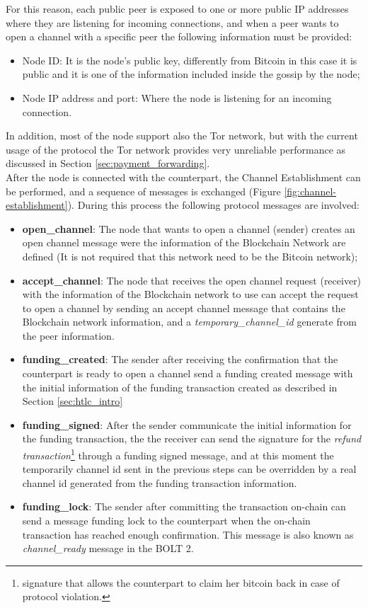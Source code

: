 For this reason, each public peer is exposed to one or more public IP addresses where
they are listening for incoming connections, and when a peer wants to open
a channel with a specific peer the following information must be provided:

\begin{itemize}
  \item Node ID: It is the node's public key, differently from Bitcoin in this case it is public and it is one of the information included inside the gossip by the node;
  \item Node IP address and port: Where the node is listening for an incoming connection.
\end{itemize}

In addition, most of the node support also the Tor network, but with the current usage of the protocol the Tor network provides very unreliable
performance as discussed in Section \ref{sec:payment_forwarding}.\\
After the node is connected with the counterpart, the Channel Establishment can be performed, and a sequence
of messages is exchanged (Figure \ref{fig:channel-establishment}). During this process
the following protocol messages are involved:

\begin{itemize}
  \item {\bf open\_channel}: The node that wants to open a channel (sender) creates an open channel message were the information of the
        Blockchain Network are defined (It is not required that this network need to be the Bitcoin network);
  \item {\bf accept\_channel}: The node that receives the open channel request (receiver) with the information of the Blockchain network to use
        can accept the request to open a channel by sending an accept channel message that contains the Blockchain network information, and
        a \emph{temporary\_channel\_id} generate from the peer information.
  \item {\bf funding\_created}: The sender after receiving the confirmation that the counterpart is ready to open a channel
        send a funding created message with the initial information of the funding transaction created as described in Section \ref{sec:htlc_intro}
  \item {\bf funding\_signed}: After the sender communicate the initial information for the funding transaction, the
        the receiver can send the signature for the \emph{refund transaction}\footnote{signature that allows the counterpart to claim her bitcoin back in case of protocol violation.} through a funding signed message, and at this moment the temporarily
        channel id sent in the previous steps can be overridden by a real channel id generated from the funding transaction information.
  \item {\bf funding\_lock}: The sender after committing the transaction on-chain can send a message funding lock to the counterpart when
        the on-chain transaction has reached enough confirmation. This message is also known as \emph{channel\_ready} message in the BOLT 2\cite{bolt2}.
\end{itemize}

